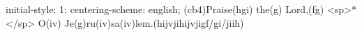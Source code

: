 initial-style: 1;
centering-scheme: english;
(cb4)Praise(hgi) the(g) Lord,(fg) <sp>*</sp> O(iv) Je(g)ru(iv)sa(iv)lem.(hijvjihijvjigf/gi/jiih)
